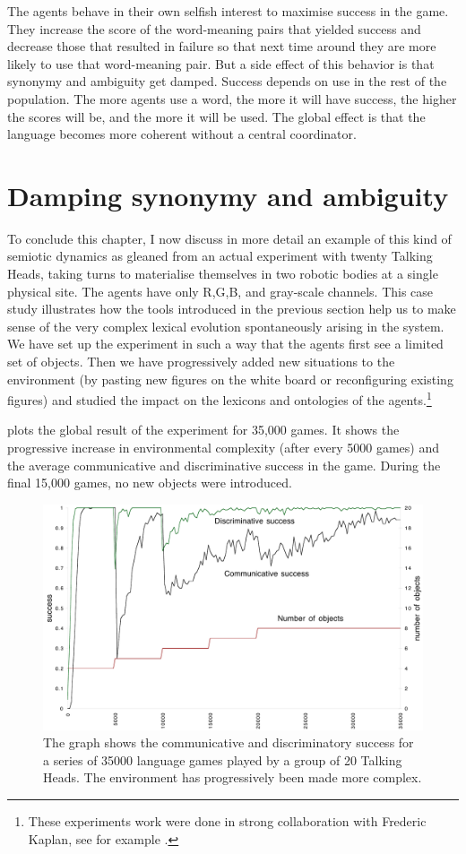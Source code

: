 The agents behave in their own selfish interest to 
maximise success in the game. They increase the score 
of the word-meaning pairs that yielded success and decrease
those that resulted in failure so that next time around 
they are more likely to use that word-meaning pair. 
But a side effect of this behavior is 
that synonymy and ambiguity get damped. Success depends 
on use in the rest of the population. The more 
agents use a word, the more it will have success, 
the higher the scores will be, and the more it will be used. 
The global effect is that the language becomes more
coherent without a central coordinator. 

\section{Damping synonymy and ambiguity}

To conclude this chapter, I now discuss in more 
detail an example of this kind of semiotic dynamics as
gleaned from  an actual experiment with twenty Talking
Heads, taking turns to materialise themselves in two robotic 
bodies at a single physical site. The agents have 
only R,G,B, and gray-scale channels. This 
case study illustrates how the tools introduced in 
the previous section help us to make sense of
the very complex lexical evolution spontaneously 
arising in the system. We have set up the experiment
in such a way that the agents first see a limited set 
of objects. Then we
have progressively added new situations
to the environment (by pasting new figures on 
the white board or reconfiguring existing figures) and studied
the impact on the lexicons and ontologies of the agents.\footnote{
These experiments work were done in strong collaboration with 
Frederic Kaplan, see for example \cite{Steels:1999}.}

 plots the global 
result of the experiment for 35,000 games. It shows the progressive 
increase in environmental complexity (after every 
5000 games) and the average communicative and discriminative
success in the game. During the final 15,000 games, no new
objects were introduced. 

\begin{figure}[htbp]
  \centerline{\includegraphics[width=.80\textwidth]{chap7/figs/globalsuccess}}
\caption{ \label{globalsuccess} The graph shows the communicative
and discriminatory success for a series of 35000 language games
played by a group of 20 Talking Heads. The environment 
has progressively been made more complex.}
\end{figure}

